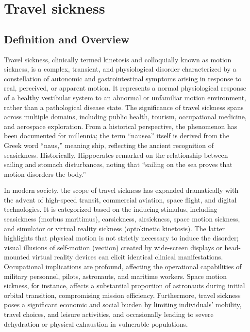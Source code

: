 \chapter{Travel sickness}

\section*{Definition and Overview}
Travel sickness, clinically termed kinetosis and colloquially known as motion sickness, is a complex, transient, and physiological disorder characterized by a constellation of autonomic and gastrointestinal symptoms arising in response to real, perceived, or apparent motion. It represents a normal physiological response of a healthy vestibular system to an abnormal or unfamiliar motion environment, rather than a pathological disease state. The significance of travel sickness spans across multiple domains, including public health, tourism, occupational medicine, and aerospace exploration. From a historical perspective, the phenomenon has been documented for millennia; the term ``nausea'' itself is derived from the Greek word ``naus,'' meaning ship, reflecting the ancient recognition of seasickness. Historically, Hippocrates remarked on the relationship between sailing and stomach disturbances, noting that ``sailing on the sea proves that motion disorders the body.''

In modern society, the scope of travel sickness has expanded dramatically with the advent of high-speed transit, commercial aviation, space flight, and digital technologies. It is categorized based on the inducing stimulus, including seasickness (morbus maritimus), carsickness, airsickness, space motion sickness, and simulator or virtual reality sickness (optokinetic kinetosis). The latter highlights that physical motion is not strictly necessary to induce the disorder; visual illusions of self-motion (vection) created by wide-screen displays or head-mounted virtual reality devices can elicit identical clinical manifestations. Occupational implications are profound, affecting the operational capabilities of military personnel, pilots, astronauts, and maritime workers. Space motion sickness, for instance, affects a substantial proportion of astronauts during initial orbital transition, compromising mission efficiency. Furthermore, travel sickness poses a significant economic and social burden by limiting individuals' mobility, travel choices, and leisure activities, and occasionally leading to severe dehydration or physical exhaustion in vulnerable populations.

